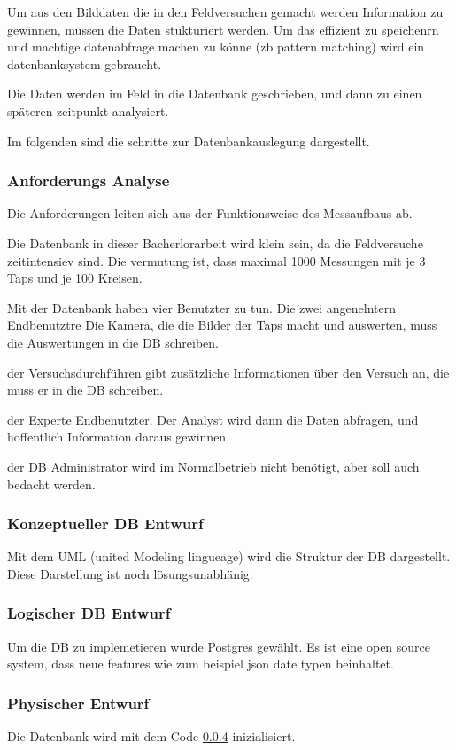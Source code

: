 Um aus den Bilddaten die in den Feldversuchen gemacht werden Information zu gewinnen, müssen die Daten stukturiert werden. Um das effizient zu speichenrn und machtige datenabfrage machen zu könne (zb pattern matching) wird ein datenbanksystem gebraucht.

Die Daten werden im Feld in die Datenbank geschrieben, und dann zu einen späteren zeitpunkt analysiert.

Im folgenden sind die schritte zur Datenbankauslegung dargestellt.

\subsubsection{Anforderungs Analyse}
Die Anforderungen leiten sich aus der Funktionsweise  des Messaufbaus ab.

Die Datenbank in dieser Bacherlorarbeit wird klein sein, da die Feldversuche zeitintensiev sind. Die vermutung ist, dass maximal 1000 Messungen mit je 3 Taps und je 100 Kreisen.

Mit der Datenbank haben vier Benutzter zu tun.
Die zwei angenelntern Endbenutztre
Die Kamera, die die Bilder der Taps macht und auswerten, muss die Auswertungen in die DB schreiben.

der Versuchsdurchführen gibt zusätzliche Informationen über den Versuch an, die muss er in die DB schreiben.

der Experte Endbenutzter.
Der Analyst wird dann die Daten abfragen, und hoffentlich Information daraus gewinnen.

der DB Administrator wird im Normalbetrieb nicht benötigt, aber soll auch bedacht werden.

\subsubsection{Konzeptueller DB Entwurf}
Mit dem UML (united Modeling lingueage) wird die Struktur der DB dargestellt. Diese Darstellung ist noch lösungsunabhänig.


\subsubsection{Logischer DB Entwurf}
Um die DB zu implemetieren wurde Postgres gewählt. Es ist eine open source system, dass neue features wie zum beispiel json date typen beinhaltet.


\subsubsection{Physischer Entwurf}
Die Datenbank wird mit dem Code \ref{} inizialisiert.

